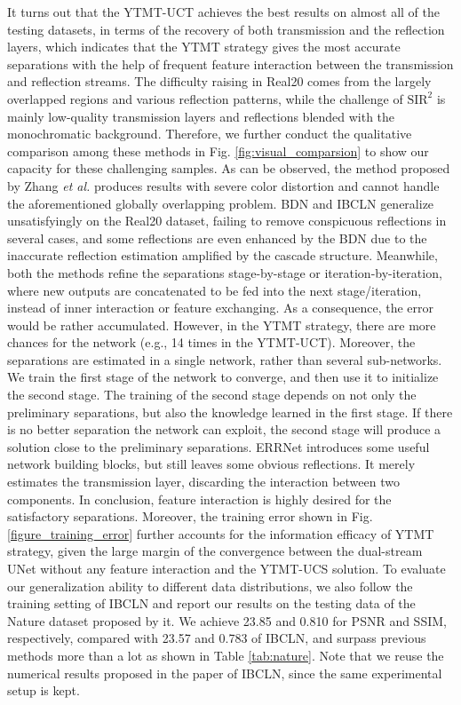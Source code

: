 \documentclass{article}
\begin{document}
It turns out that the YTMT-UCT achieves the best results on almost all of the testing datasets, in terms of the recovery of both transmission and the reflection layers, which indicates that the YTMT strategy gives the most accurate separations with the help of frequent feature interaction between the transmission and reflection streams. The difficulty raising in Real20 comes from the largely overlapped regions and various reflection patterns, while the challenge of $\textrm{SIR}^2$ is mainly low-quality transmission layers and reflections blended with the monochromatic background. Therefore, we further conduct the qualitative comparison among these methods in Fig. \ref{fig:visual_comparsion} to show our capacity for these challenging samples. As can be observed, the method proposed by Zhang \emph{et al.} produces results with severe color distortion and cannot handle the aforementioned globally overlapping problem. BDN and IBCLN generalize unsatisfyingly on the Real20 dataset, failing to remove conspicuous reflections in several cases, and some reflections are even enhanced by the BDN due to the inaccurate reflection estimation amplified by the cascade structure. Meanwhile, both the methods refine the separations stage-by-stage or iteration-by-iteration, where new outputs are concatenated to be fed into the next stage/iteration, instead of inner interaction or feature exchanging. As a consequence, the error would be rather accumulated. However, in the YTMT strategy, there are more chances for the network (e.g., 14 times in the YTMT-UCT). Moreover, the separations are estimated in a single network, rather than several sub-networks. We train the first stage of the network to converge, and then use it to initialize the second stage. The training of the second stage depends on not only the preliminary separations, but also the knowledge learned in the first stage. If there is no better separation the network can exploit, the second stage will produce a solution close to the preliminary separations. ERRNet introduces some useful network building blocks, but still leaves some obvious reflections. It merely estimates the transmission layer, discarding the interaction between two components. In conclusion, feature interaction is highly desired for the satisfactory separations. Moreover, the training error shown in Fig. \ref{figure_training_error} further accounts for the information efficacy of YTMT strategy, given the large margin of the convergence between the dual-stream UNet without any feature interaction and the YTMT-UCS solution.
To evaluate our generalization ability to different data distributions, we also follow the training setting of IBCLN \cite{DBLP:conf/cvpr/LiY0LH20} and report our results on the testing data of the Nature dataset proposed by it. We achieve 23.85 and 0.810 for PSNR and SSIM, respectively, compared with 23.57 and 0.783 of IBCLN, and surpass previous methods more than a lot as shown in Table \ref{tab:nature}. Note that we reuse the numerical results proposed in the paper of IBCLN, since the same experimental setup is kept. 
\end{document}
